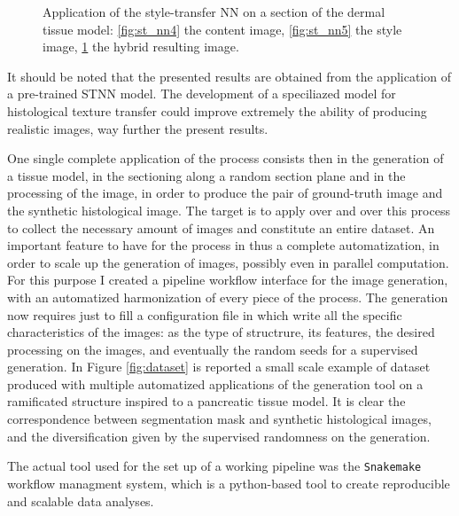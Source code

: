 \begin{description}
\begin{figure}
\begin{subfigure}[t]{0.3\textwidth}
                 \caption{}
                 \label{fig:st_nn6}
            \end{subfigure}
            \caption{Application of the style-transfer NN on a section of the dermal tissue model: \ref{fig:st_nn4} the content image, \ref{fig:st_nn5} the style image, \ref{fig:st_nn6} the hybrid resulting image.}
            \label{fig:derm_stnn}
        \end{figure}

        It should be noted that the presented results are obtained from the application of a pre-trained STNN model. The development of a speciliazed model for histological texture transfer could improve extremely the ability of producing realistic images, way further the present results.
    \end{description}

One single complete application of the process consists then in the generation of a tissue model, in the sectioning along a random section plane and in the processing of the image, in order to produce the pair of ground-truth image and the synthetic histological image. The target is to apply over and over this process to collect the necessary amount of images and constitute an entire dataset. An important feature to have for the process in thus a complete automatization, in order to scale up the generation of images, possibly even in parallel computation.
For this purpose I created a pipeline workflow interface for the image generation, with an automatized harmonization of every piece of the process. The generation now requires just to fill a configuration file in which write all the specific characteristics of the images: as the type of structrure, its features, the desired processing on the images, and eventually the random seeds for a supervised generation. In Figure \ref{fig:dataset} is reported a small scale example of dataset produced with multiple automatized applications of the generation tool on a ramificated structure inspired to a pancreatic tissue model. It is clear the correspondence between segmentation mask and synthetic histological images, and the diversification given by the supervised randomness on the generation.

The actual tool used for the set up of a working pipeline was the \texttt{Snakemake} \cite{10.1093/bioinformatics/bts480} workflow managment system, which is a python-based tool to create reproducible and scalable data analyses.

